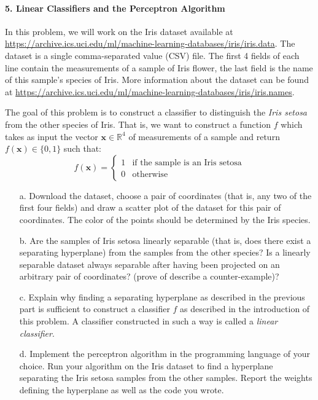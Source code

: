 \documentclass[11pt]{article}
\newcommand{\bx}{\mathbf{x}}
\begin{document}
\paragraph{5. Linear Classifiers and the Perceptron Algorithm}

In this problem, we will work on the Iris dataset available at
\url{https://archive.ics.uci.edu/ml/machine-learning-databases/iris/iris.data}.
The dataset is a single comma-separated value (CSV) file. The first 4 fields of
each line contain the measurements of a sample of Iris flower, the
last field is the name of this sample's species of Iris. More information about
the dataset can be found at
\url{https://archive.ics.uci.edu/ml/machine-learning-databases/iris/iris.names}.

The goal of this problem is to construct a classifier to distinguish the
\emph{Iris setosa} from the other species of Iris. That is, we want to construct
a function $f$ which takes as input the vector $\bx\in\mathbb{R}^4$ of
measurements of a sample and return $f(\bx)\in\{0,1\}$ such that:
\begin{displaymath}
    f(\bx) = \begin{cases}
        1& \text{if the sample is an Iris setosa}\\
        0& \text{otherwise}
    \end{cases}
\end{displaymath}

\begin{itemize}
    \item[a.] Download the dataset, choose a pair of coordinates (that is, any
        two of the first four fields) and draw a scatter plot of the dataset
        for this pair of coordinates. The color of the points should be
        determined by the Iris species.
    \item[b.] Are the samples of Iris setosa linearly separable (that is, does
        there exist a separating hyperplane) from the samples from the other
        species? Is a linearly separable dataset always separable after having
        been projected on an arbitrary pair of coordinates? (prove of describe
        a counter-example)?
    \item[c.] Explain why finding a separating hyperplane as described in the
        previous part is sufficient to construct a classifier $f$ as
        described in the introduction of this problem. A classifier constructed
        in such a way is called a \emph{linear classifier}.
    \item[d.] Implement the perceptron algorithm in the programming language of
        your choice. Run your algorithm on the Iris dataset to find
        a hyperplane separating the Iris setosa samples from the other samples.
        Report the weights defining the hyperplane as well as the code you
        wrote.
\end{itemize}
\end{document}
